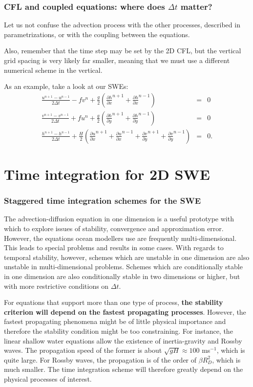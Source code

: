 \documentclass[xcolor=dvipsnames]{beamer} %
\newcommand{\BSS}{ \begin{scriptsize}}
\newcommand{\ESS}{ \end{scriptsize}}
\newcommand{\partd}[2]{\frac{\partial #1}{\partial #2}}
\begin{document}
\frame
{
	\frametitle{CFL and coupled equations: where does $\Delta t$ matter?}
	\BSS
	Let us not confuse the advection process with the other processes, described in parametrizations, or with the coupling between the equations. 
	
	Also, remember that the time step may be set by the 2D CFL, but the vertical grid spacing is very likely far smaller, meaning that we must use a different numerical scheme in the vertical.
	
	As an example, take a look at our SWEs:
	\begin{eqnarray*}
		\frac{u^{n+1}-u^{n-1}}{2\Delta t}-fv^n+\frac{g}{2}
		\left( \partd{h}{x}^{n+1} +\partd{h}{x}^{n-1} \right) & = & 0 \\
		\frac{v^{n+1}-v^{n-1}}{2\Delta t}+fu^n+\frac{g}{2}
		\left( \partd{h}{y}^{n+1} +\partd{h}{y}^{n-1} \right) & = & 0 \\
		\frac{h^{n+1}-h^{n-1}}{2\Delta t}+\frac{H}{2}
		\left( \partd{u}{x}^{n+1} +\partd{u}{x}^{n-1}
		+\partd{v}{y}^{n+1} +\partd{v}{y}^{n-1} 
		\right) & = & 0. 
	\end{eqnarray*}
	
	\ESS
}

\section{Time integration for 2D SWE}
\frame
{
	\frametitle{Staggered time integration schemes for the SWE}
	\BSS
	The advection-diffusion equation in one dimension is a useful prototype with which to explore issues of stability, convergence and approximation error. However, the equations ocean modellers use are frequently multi-dimensional. This leads to special problems and results in some cases. With regards to temporal stability, however, schemes which are unstable in one dimension are also unstable in multi-dimensional problems. Schemes which are conditionally stable in one dimension are also conditionally stable in two dimensions or higher, but with more restrictive conditions on $\Delta t$.
	
	\vspace{0.2cm}For equations that support more than one type of process, {\bf the stability criterion will depend on the fastest propagating processes}. However, the fastest propagating phenomena might be of little physical importance and therefore the stability condition might be too constraining. For instance, the linear shallow water equations allow the existence of inertia-gravity and Rossby waves. The propagation speed of the former is about $\sqrt{gH} \approx 100 $ ms$^{-1}$, which is quite large. For Rossby waves, the propagation is of the order of $\beta R_D^2$, which is much smaller. The time integration scheme will therefore greatly depend on the physical processes of interest. 
	
	\hspace{2cm}
	\ESS
}
\end{document}
